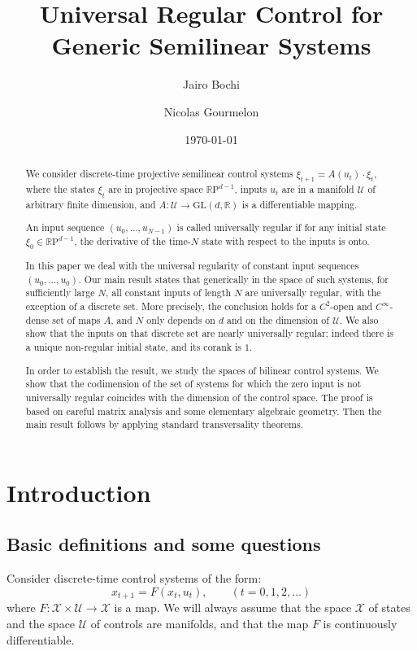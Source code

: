 \documentclass[10pt, a4paper]{amsart}
\title[Universal Regular Control]{Universal Regular Control for Generic Semilinear Systems}
\author[Bochi]{Jairo Bochi}
\author[Gourmelon]{Nicolas Gourmelon}
\date{\today}
\theoremstyle{plain}
\theoremstyle{definition}
\theoremstyle{remark}
\theoremstyle{note}
\numberwithin{equation}{section}
\begin{document}
\begin{abstract} 
We consider discrete-time projective semilinear control systems $\xi_{t+1} = A(u_t) \cdot \xi_t$, where the states $\xi_t$ are in projective space ${\mathbb{R}\mathrm{P}}^{d-1}$, inputs $u_t$ are in a manifold ${\mathcal{U}}$ of arbitrary finite dimension, and $A \colon {\mathcal{U}} \to {\mathrm{GL}}(d,{\mathbb{R}})$ is a differentiable mapping.

An input sequence $(u_0,\ldots,u_{N-1})$ is called universally regular if for any initial state $\xi_0 \in {\mathbb{R}\mathrm{P}}^{d-1}$, the derivative of the time-$N$ state with respect to the inputs is onto.

In this paper we deal with the universal regularity of constant input sequences $(u_0, \dots, u_0)$. Our main result states that generically in the space of such systems, for sufficiently large $N$, all constant inputs of length $N$ are universally regular, with the exception of a discrete set. More precisely, the conclusion holds for a $C^2$-open and $C^\infty$-dense set of maps $A$, and $N$ only depends on $d$ and on the dimension of ${\mathcal{U}}$. We also show that the inputs on that discrete set are nearly universally regular; indeed there is a unique non-regular initial state, and its corank is $1$.

In order to establish the result, we study the spaces of bilinear control systems. We show that the codimension of the set of systems for which the zero input is not universally regular coincides with the dimension of the control space. The proof is based on careful matrix analysis and some elementary algebraic geometry. Then the main result follows by applying standard transversality theorems.
\end{abstract}

\maketitle

\section{Introduction}\label{s.intro}

\subsection{Basic definitions and some questions}

Consider discrete-time control systems of the form:
\begin{equation}\label{e.general CS}
x_{t+1} = F(x_t,u_t), \qquad (t = 0,1,2, \dots)
\end{equation}
where $F \colon {\mathcal{X}} \times {\mathcal{U}} \to {\mathcal{X}}$ is a map.
We will always assume that the space ${\mathcal{X}}$ of states and the space ${\mathcal{U}}$ of controls are manifolds, and that the map $F$ is continuously differentiable.
\end{document}
